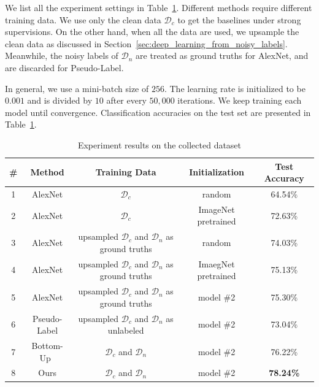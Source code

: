 \documentclass[10pt,twocolumn,letterpaper]{article}
\begin{document}
We list all the experiment settings in Table~\ref{tab:exp}. Different methods require different training data. We use only the clean data $\mathcal{D}_c$ to get the baselines under strong supervisions. On the other hand, when all the data are used, we upsample the clean data as discussed in Section~\ref{sec:deep_learning_from_noisy_labels}. Meanwhile, the noisy labels of $\mathcal{D}_n$ are treated as ground truths for AlexNet, and are discarded for Pseudo-Label.

In general, we use a mini-batch size of $256$. The learning rate is initialized to be $0.001$ and is divided by $10$ after every $50,000$ iterations. We keep training each model until convergence. Classification accuracies on the test set are presented in Table~\ref{tab:exp}.

\begin{table}[t]
\begin{center}
\begin{tabular}{c|c|c|c|c}
\hline
\# & Method & Training Data & Initialization & Test Accuracy\\
\hline\hline
1 & AlexNet & $\mathcal{D}_c$ & random & 64.54\% \\
2 & AlexNet & $\mathcal{D}_c$ & ImageNet pretrained & 72.63\% \\
3 & AlexNet & upsampled $\mathcal{D}_c$ and $\mathcal{D}_n$ as ground truths & random & 74.03\% \\
4 & AlexNet & upsampled $\mathcal{D}_c$ and $\mathcal{D}_n$ as ground truths & ImaegNet pretrained & 75.13\% \\
5 & AlexNet & upsampled $\mathcal{D}_c$ and $\mathcal{D}_n$ as ground truths & model \#2 & 75.30\% \\
6 & Pseudo-Label\cite{lee2013pseudo} & upsampled $\mathcal{D}_c$ and $\mathcal{D}_n$ as unlabeled & model \#2 & 73.04\% \\
7 & Bottom-Up~\cite{sukhbaatar2014learning} & $\mathcal{D}_c$ and $\mathcal{D}_n$ & model \#2 & 76.22\% \\
8 & Ours & $\mathcal{D}_c$ and $\mathcal{D}_n$ & model \#2 & \textbf{78.24\%} \\
\hline
\end{tabular}
\end{center}
\caption{Experiment results on the collected dataset}
\label{tab:exp}
\end{table}
\end{document}
